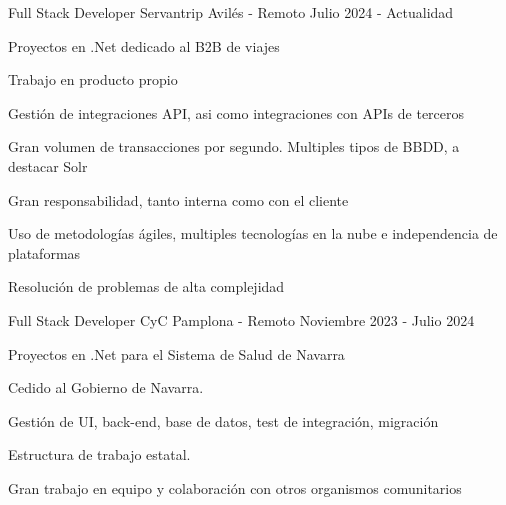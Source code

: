 

\begin{cventries}
    \cventry
    {Full Stack Developer} %
    {Servantrip} %
    {Avilés - Remoto} %
    {Julio 2024 - Actualidad} %
    {
        \begin{cvitems} %
            \item {Proyectos en .Net dedicado al B2B de viajes}
            \item {Trabajo en producto propio}
            \item {Gestión de integraciones API, asi como integraciones con APIs de terceros}
            \item {Gran volumen de transacciones por segundo. Multiples tipos de BBDD, a destacar Solr}
            \item {Gran responsabilidad, tanto interna como con el cliente}
            \item {Uso de metodologías ágiles, multiples tecnologías en la nube e independencia de plataformas}
            \item {Resolución de problemas de alta complejidad}
        \end{cvitems}
    }
    \cventry
    {Full Stack Developer} %
    {CyC} %
    {Pamplona - Remoto} %
    {Noviembre 2023 - Julio 2024} %
    {
        \begin{cvitems} %
            \item {Proyectos en .Net para el Sistema de Salud de Navarra}
            \item {Cedido al Gobierno de Navarra.}
            \item {Gestión de UI, back-end, base de datos, test de integración, migración}
            \item {Estructura de trabajo estatal.}
            \item {Gran trabajo en equipo y colaboración con otros organismos comunitarios}

\end{cvitems}}
\end{cventries}
